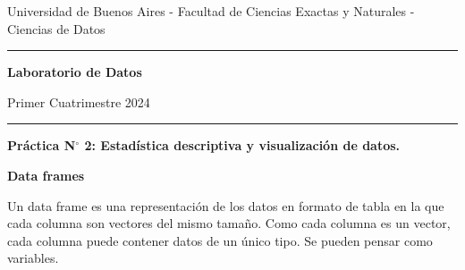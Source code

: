 \documentclass[a4paper,11pt]{article}
\theoremstyle{definition}
\begin{document}
\centerline{{\small Universidad de Buenos Aires - Facultad de Ciencias Exactas y Naturales - Ciencias de Datos}}

\vskip 0.2cm

\hrule

\vskip 0.2cm

 \centerline{{\bf\Large{\sc Laboratorio de Datos}}}

 \vskip 0.2cm

 \centerline{\ttfamily Primer Cuatrimestre 2024}

\vskip 0.2cm

 \hrule

 \bigskip
 \centerline{\bf Práctica N$^\circ$ 2: Estad\'istica descriptiva y visualizaci\'on de datos.}
 \bigskip


\textbf{\bf Data frames}

Un data frame es una representaci\'on de los datos en formato de tabla en la que cada columna son vectores del mismo tamaño. Como cada columna es un vector, cada columna puede contener datos de un \'unico tipo. Se pueden pensar como variables.
\end{document}
